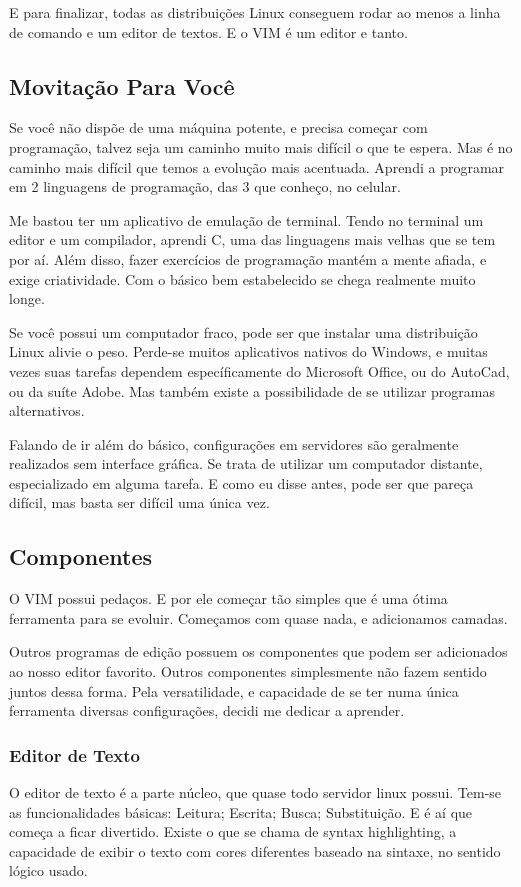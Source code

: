 \documentclass[a4paper, 12pt]{article}
\begin{document}
E para finalizar, todas as distribuições Linux conseguem rodar ao menos a linha de comando e um editor de textos.
E o VIM é um editor e tanto.

\subsection{Movitação Para Você}
Se você não dispõe de uma máquina potente, e precisa começar com programação, talvez seja um caminho muito mais difícil o que te espera.
Mas é no caminho mais difícil que temos a evolução mais acentuada.
Aprendi a programar em 2 linguagens de programação, das 3 que conheço, no celular.

Me bastou ter um aplicativo de emulação de terminal.
Tendo no terminal um editor e um compilador, aprendi C, uma das linguagens mais velhas que se tem por aí.
Além disso, fazer exercícios de programação mantém a mente afiada, e exige criatividade.
Com o básico bem estabelecido se chega realmente muito longe.

Se você possui um computador fraco, pode ser que instalar uma distribuição Linux alivie o peso.
Perde-se muitos aplicativos nativos do Windows, e muitas vezes suas tarefas dependem específicamente do Microsoft Office, ou do AutoCad, ou da suíte Adobe.
Mas também existe a possibilidade de se utilizar programas alternativos.

Falando de ir além do básico, configurações em servidores são geralmente realizados sem interface gráfica.
Se trata de utilizar um computador distante, especializado em alguma tarefa.
E como eu disse antes, pode ser que pareça difícil, mas basta ser difícil uma única vez.

\subsection{Componentes}
O VIM possui pedaços.
E por ele começar tão simples que é uma ótima ferramenta para se evoluir.
Começamos com quase nada, e adicionamos camadas.

Outros programas de edição possuem os componentes que podem ser adicionados ao nosso editor favorito.
Outros componentes simplesmente não fazem sentido juntos dessa forma.
Pela versatilidade, e capacidade de se ter numa única ferramenta diversas configurações, decidi me dedicar a aprender.

\subsubsection{Editor de Texto}
O editor de texto é a parte núcleo, que quase todo servidor linux possui.
Tem-se as funcionalidades básicas: Leitura; Escrita; Busca; Substituição.
E é aí que começa a ficar divertido.
Existe o que se chama de syntax highlighting, a capacidade de exibir o texto com cores diferentes baseado na sintaxe, no sentido lógico usado.
\end{document}
